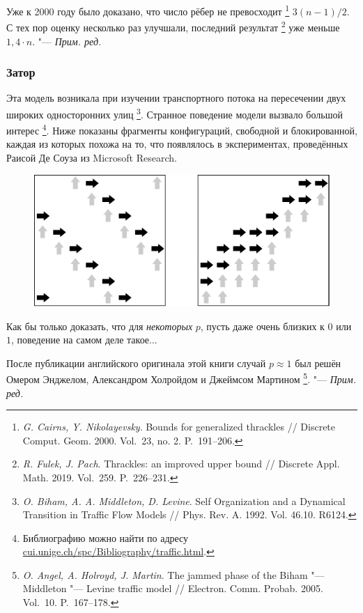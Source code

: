 \documentclass[twoside]{book}
\newenvironment{addedbytheeditors}{\par\medskip\small
}{\par\addvspace{\medskipamount}} %
\begin{document}
\begin{addedbytheeditors}
Уже к 2000 году было доказано, что число рёбер не превосходит%
\footnote{\emph{G. Cairns, Y. Nikolayevsky}.
Bounds for generalized thrackles /\!/ 
Discrete Comput. Geom. 2000.  Vol.~23, no. 2. P.~191--206.}
$3(n-1)/2$.
С тех пор оценку несколько раз улучшали, последний результат%
\footnote{\emph{R. Fulek, J. Pach}. Thrackles: an improved upper bound /\!/  Discrete Appl. Math.  2019. Vol.~259. P.~226--231.}
уже меньше $1{,}4\cdot n$. "--- \emph{Прим. ред.}
\end{addedbytheeditors}

\subsubsection*{Затор}

Эта модель возникала при изучении транспортного потока на пересечении двух широких односторонних улиц%
\footnote{\emph{O. Biham, A. A. Middleton, D. Levine}. Self Organization and a Dynamical Transition in Traffic Flow Models /\!/ {Phys. Rev. A}. 1992. Vol. 46.10. R6124.}.
Странное поведение модели вызвало большой интерес%
\footnote{Библиографию можно найти по адресу
\href{http://cui.unige.ch/spc/Bibliography/traffic.html.}{\url{cui.unige.ch/spc/Bibliography/traffic.html}}.}.
Ниже показаны фрагменты конфигураций,
свободной и блокированной,
каждая из которых похожа на то, что появлялось в экспериментах,
проведённых Раисой Де Соуза из Microsoft Research.

\begin{figure}[!ht]
\centering
\includegraphics[scale=.9]{mp/wink-32}
\end{figure}


Как бы только доказать, что для \emph{некоторых} $p$, пусть даже очень близких к $0$ или $1$, поведение на самом деле такое...

\begin{addedbytheeditors}
После публикации английского оригинала этой книги случай $p\approx 1$ был решён Омером Энджелом,
Александром Холройдом и Джеймсом Мартином%
\footnote{\emph{O. Angel, A. Holroyd, J. Martin}. 
The jammed phase of the Biham "--- Middleton "--- Levine traffic model /\!/
{Electron. Comm. Probab.} 2005. Vol.~10. P.~167--178.}. "---
\emph{Прим. ред.}
\end{addedbytheeditors}
\end{document}
